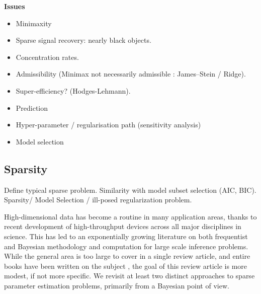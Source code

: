 \documentclass[11pt]{article}
\numberwithin{equation}{section}
\begin{document}
\textbf{Issues}
\begin{itemize}
	\item Minimaxity 
	\item Sparse signal recovery: nearly black objects. 
	\item Concentration rates.
	\item Admissibility (Minimax not necessarily admissible : James--Stein / Ridge). 
	\item Super-efficiency? (Hodges-Lehmann). 
	\item Prediction 
	\item Hyper-parameter / regularisation path (sensitivity analysis)
	\item Model selection 
\end{itemize}

\subsection{Sparsity}

\textcolor[rgb]{1,0.41,0.13}{Define typical sparse problem. Similarity with model subset selection (AIC, BIC). Sparsity/ Model Selection / ill-posed regularization problem.}


High-dimensional data has become a routine in many application areas, thanks to recent development of high-throughput devices across all major disciplines in science. This has led to an exponentially growing literature on both frequentist and Bayesian methodology and computation for large scale inference problems.  While the general area is too large to cover in a single review article, and entire books have been written on the subject \citep[see, e.g., ][]{hastie09}, the goal of this review article is more modest, if not more specific. We revisit at least two distinct approaches to sparse parameter estimation problems, primarily from a Bayesian point of view. 
\end{document}
